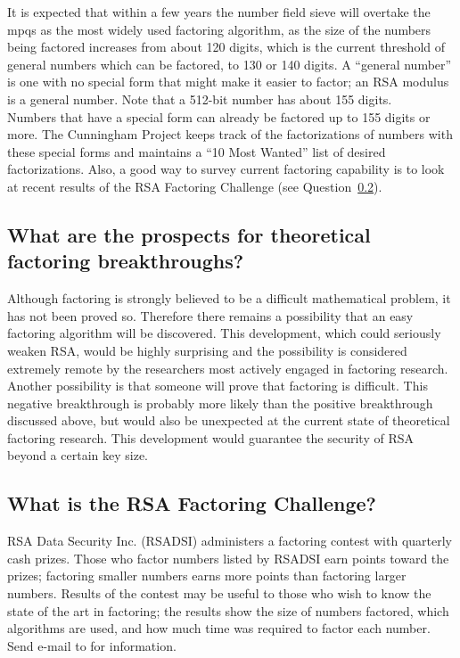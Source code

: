 It is expected that within a few years the number field sieve will
overtake the mpqs as the most widely used factoring algorithm, as the
size of the numbers being factored increases from about 120 digits,
which is the current threshold of general numbers which can be
factored, to 130 or 140 digits. A ``general number'' is one with no
special form that might make it easier to factor; an RSA modulus is a
general number. Note that a 512-bit number has about 155 digits.\\

Numbers that have a special form can already be factored up to 155
digits or more. The Cunningham Project keeps track of the
factorizations of numbers with these special forms and maintains a ``10
Most Wanted'' list of desired factorizations. Also, a good way to
survey current factoring capability is to look at recent results of the
RSA Factoring Challenge (see Question~\ref{what_rsa_fac}).\\

\subsection{What are the prospects for theoretical factoring
breakthroughs?}
\label{what_pros_fac}

Although factoring is strongly believed to be a difficult mathematical
problem, it has not been proved so. Therefore there remains a
possibility that an easy factoring algorithm will be discovered. This
development, which could seriously weaken RSA, would be highly
surprising and the possibility is considered extremely remote by the
researchers most actively engaged in factoring research.\\

Another possibility is that someone will prove that factoring is
difficult. This negative breakthrough is probably more likely than the
positive breakthrough discussed above, but would also be unexpected at
the current state of theoretical factoring research. This development
would guarantee the security of RSA beyond a certain key size.

\subsection{What is the RSA Factoring Challenge?}
\label{what_rsa_fac}

RSA Data Security Inc. (RSADSI) administers a factoring contest with
quarterly cash prizes. Those who factor numbers listed by RSADSI earn
points toward the prizes; factoring smaller numbers earns more points
than factoring larger numbers. Results of the contest may be useful to
those who wish to know the state of the art in factoring; the results
show the size of numbers factored, which algorithms are used, and how
much time was required to factor each number. Send e-mail to
for information.

